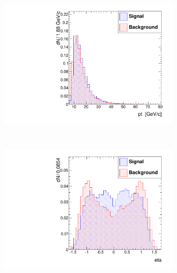 \documentclass[10pt,a4paper]{article}
\begin{document}
\begin{figure}
        \centering
        \begin{subfigure}[b]{0.2\textwidth}
                \centering
                \includegraphics[width=\textwidth]{Figures/pt_barrel}
                \label{fig:ptBarrel}
        \end{subfigure}
        ~
        \begin{subfigure}[b]{0.2\textwidth}
                \centering
                \includegraphics[width=\textwidth]{Figures/eta_barrel}
                \label{fig:etaBarrel}
        \end{subfigure}

\end{figure}
\end{document}
